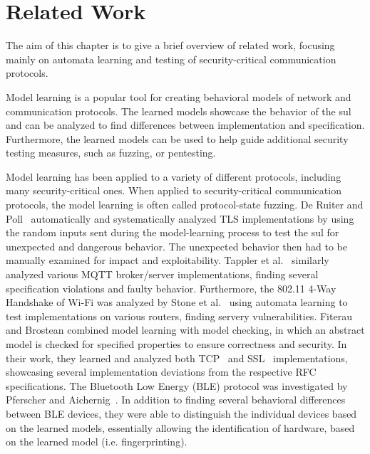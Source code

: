 %
%
% 

\chapter{Related Work}

\label{chap:Related}
The aim of this chapter is to give a brief overview of related work, focusing mainly on automata learning and testing of security-critical communication protocols.

Model learning is a popular tool for creating behavioral models of network and communication protocols. The learned models showcase the behavior of the \ac{sul} and can be analyzed to find differences between implementation and specification. Furthermore, the learned models can be used to help guide additional security testing measures, such as fuzzing, or pentesting. 

Model learning has been applied to a variety of different protocols, including many security-critical ones. When applied to security-critical communication protocols, the model learning is often called protocol-state fuzzing. De Ruiter and Poll~\cite{DBLP:conf/uss/RuiterP15} automatically and systematically analyzed TLS implementations by using the random inputs sent during the model-learning process to test the \ac{sul} for unexpected and dangerous behavior. The unexpected behavior then had to be manually examined for impact and exploitability. Tappler et al.~\cite{DBLP:conf/icst/TapplerAB17} similarly analyzed various MQTT broker/server implementations, finding several specification violations and faulty behavior. Furthermore, the 802.11 4-Way Handshake of Wi-Fi was analyzed by Stone et al.~\cite{DBLP:conf/esorics/StoneCR18} using automata learning to test implementations on various routers, finding servery vulnerabilities.
Fiterau and Brostean combined model learning with model checking, in which an abstract model is checked for specified properties to ensure correctness and security. In their work, they learned and analyzed both TCP~\cite{DBLP:conf/cav/Fiterau-Brostean16} and SSL~\cite{DBLP:conf/spin/Fiterau-Brostean17} implementations, showcasing several implementation deviations from the respective RFC specifications.
The Bluetooth Low Energy (BLE) protocol was investigated by Pferscher and Aichernig~\cite{pferscher2021fingerprinting}. In addition to finding several behavioral differences between BLE devices, they were able to distinguish the individual devices based on the learned models, essentially allowing the identification of hardware, based on the learned model (i.e. fingerprinting).

